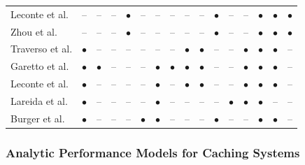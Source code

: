 \begin{table}
\begin{tabular}{|l|ccccc|cc|cc|cc|cccc|}
    Leconte et al. \cite{leconte2014adaptive} & -- & -- & -- & $\bullet$ & -- & -- & -- & -- & -- & $\bullet$ & -- & -- & $\bullet$ & $\bullet$ & $\bullet$ \\
    Zhou et al. \cite{zhou2015unifying} & -- & -- & -- & $\bullet$ & -- & -- & -- & -- & -- & $\bullet$ & -- & -- & $\bullet$ & $\bullet$ & $\bullet$ \\
    Traverso et al. \cite{traverso2013temporal} & $\bullet$ & -- & -- & -- & -- & -- & -- & $\bullet$ & $\bullet$ & -- & -- & $\bullet$ & $\bullet$ & $\bullet$ & -- \\
    Garetto et al. \cite{garetto2014dynamic} & $\bullet$ & $\bullet$ & -- & -- & -- & $\bullet$ & $\bullet$ & $\bullet$ & $\bullet$ & -- & -- & $\bullet$ & $\bullet$ & $\bullet$ & -- \\
    Leconte et al. \cite{leconte2016dynamic} & $\bullet$ & -- & -- & -- & -- & $\bullet$ & -- & $\bullet$ & $\bullet$ & -- & -- & $\bullet$ & $\bullet$ & $\bullet$ & -- \\ \hline
    Lareida et al. \cite{lareida2015augmenting} & $\bullet$ & -- & -- & -- & -- & $\bullet$ & -- & -- & -- & -- & $\bullet$ & $\bullet$ & $\bullet$ & -- & -- \\
    Burger et al. \cite{burger2016hierarchical} & $\bullet$ & -- & -- & -- & $\bullet$ & $\bullet$ & -- & -- & -- & $\bullet$ & -- & -- & $\bullet$ & $\bullet$ & -- \\
		\hline
	\end{tabular}%
\end{table}

\subsubsection{Analytic Performance Models for Caching Systems}


